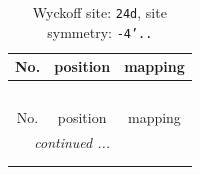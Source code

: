 \documentclass[fleqn,8pt]{jsarticle}
\begin{document}
\renewcommand{\arraystretch}{1.2}
\begin{longtable}{ccc}
\caption{Wyckoff site: {\tt 24d}, site symmetry: {\tt -4'..}}
 \\
 \hline \hline
No. & position & mapping \\ \hline \endfirsthead

\multicolumn{2}{l}{\tablename\ \thetable{}} \\
 \hline \hline
No. & position & mapping \\ \hline \endhead

 \hline \hline
\multicolumn{2}{r}{\footnotesize\it continued ...} \\ \endfoot

 \hline \hline
\multicolumn{2}{r}{} \\ \endlastfoot


\end{longtable}
\end{document}
